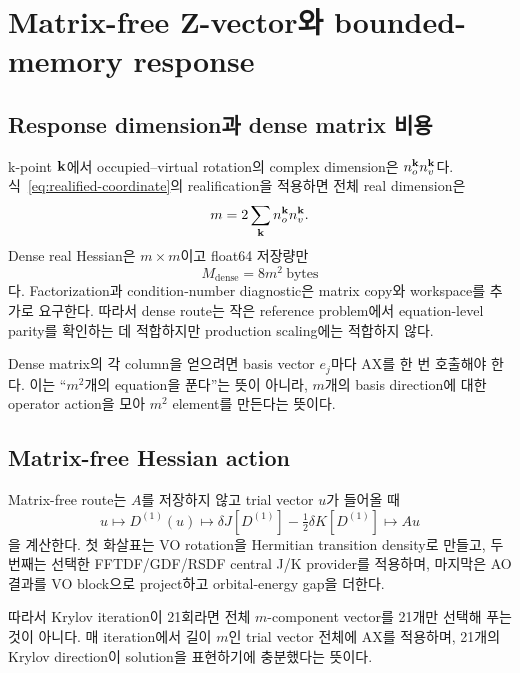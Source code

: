 \section{Matrix-free Z-vector와 bounded-memory response}
\label{sec:matrix-free-bounded-memory}

\subsection{Response dimension과 dense matrix 비용}

k-point $\mathbf{k}$에서 occupied--virtual rotation의 complex dimension은
$n_o^{\mathbf{k}}n_v^{\mathbf{k}}$다. 식~\eqref{eq:realified-coordinate}의 realification을 적용하면 전체
real dimension은
\begin{equation}
  m=2\sum_{\mathbf{k}}n_o^{\mathbf{k}}n_v^{\mathbf{k}}.
  \label{eq:response-real-dimension}
\end{equation}
Dense real Hessian은 $m\times m$이고 float64 저장량만
\begin{equation}
  M_{\mathrm{dense}}=8m^2\ \text{bytes}
  \label{eq:dense-hessian-storage}
\end{equation}
다. Factorization과 condition-number diagnostic은 matrix copy와 workspace를 추가로
요구한다. 따라서 dense route는 작은 reference problem에서 equation-level parity를
확인하는 데 적합하지만 production scaling에는 적합하지 않다.

Dense matrix의 각 column을 얻으려면 basis vector $e_j$마다 AX를 한 번 호출해야 한다.
이는 ``$m^2$개의 equation을 푼다''는 뜻이 아니라, $m$개의 basis direction에 대한
operator action을 모아 $m^2$ element를 만든다는 뜻이다.

\subsection{Matrix-free Hessian action}

Matrix-free route는 $A$를 저장하지 않고 trial vector $u$가 들어올 때
\begin{equation}
  u\longmapsto D^{(1)}(u)
  \longmapsto \delta J[D^{(1)}]-\tfrac12\delta K[D^{(1)}]
  \longmapsto Au
  \label{eq:matrix-free-action}
\end{equation}
을 계산한다. 첫 화살표는 VO rotation을 Hermitian transition density로 만들고, 두 번째는
선택한 FFTDF/GDF/RSDF central J/K provider를 적용하며, 마지막은 AO 결과를 VO block으로
project하고 orbital-energy gap을 더한다.

따라서 Krylov iteration이 21회라면 전체 $m$-component vector를 21개만 선택해 푸는 것이
아니다. 매 iteration에서 길이 $m$인 trial vector 전체에 AX를 적용하며, 21개의 Krylov
direction이 solution을 표현하기에 충분했다는 뜻이다.


